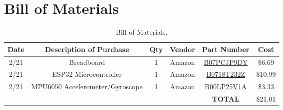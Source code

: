 \chapter{Bill of Materials}
\label{chap:bom}

\begin{table}
  \centering
  \begin{tabular}{|c|c|c|c|c|c|}\hline
    Date & Description of Purchase & Qty & Vendor & Part Number & Cost\\\hline\hline
    2/21 & Breadboard & 1 & Amazon & \href{https://www.amazon.com/Pcs-MCIGICM-Points-Solderless-Breadboard/dp/B07PCJP9DY/}{B07PCJP9DY}
                                                                & \$6.69\\\hline
    2/21 & ESP32 Microcontroller & 1 & Amazon & \href{https://www.amazon.com/HiLetgo-ESP-WROOM-32-Development-Microcontroller-Integrated/dp/B0718T232Z/}{B0718T232Z}
                                                                & \$10.99\\\hline
    2/21 & MPU6050 Accelerometer/Gyroscope & 1 & Amazon & \href{https://www.amazon.com/HiLetgo-MPU-6050-Accelerometer-Gyroscope-Converter/dp/B00LP25V1A/}{B00LP25V1A}
                                                                & \$3.33\\\hline\hline
         & & & & \textbf{TOTAL} & \$21.01\\\hline
  \end{tabular}
  
  \caption{Bill of Materials.}
\end{table}


